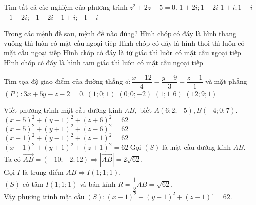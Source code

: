 \begin{ex}%
	Tìm tất cả các nghiệm của phương trình $z^2 + 2z +5=0$.
	\choice
	{$1+2i; 1-2i $}
	{$1+i; 1-i $}
	{\True $-1+2i; -1-2i $}
	{$-1+i; -1-i $}
\end{ex}
\begin{ex}%
	Trong các mệnh đề sau, mệnh đề nào đúng?
	\choice
	{Hình chóp có đáy là hình thang vuông thì luôn có mặt cầu ngoại tiếp}
	{Hình chóp có đáy là hình thoi thì luôn có mặt cầu ngoại tiếp}
	{Hình chóp có đáy là tứ giác thì luôn có mặt cầu ngoại tiếp}
	{\True Hình chóp có đáy là hình tam giác thì luôn có mặt cầu ngoại tiếp}
\end{ex}
\begin{ex}%
	Tìm tọa độ giao điểm của đường thẳng $d\colon \dfrac{x-12}{4}=\dfrac{y-9}{3}=\dfrac{z-1}{1}$ và mặt phẳng $(P)\colon 3x+5y-z-2=0$.
	\choice
	{$(1;0;1)$}
	{\True $(0;0;-2)$}
	{$(1;1;6)$}
	{$(12;9;1)$}
\end{ex}
\begin{ex}%
	Viết phương trình mặt cầu đường kính $ AB, $ biết $ A(6;2;-5), B(-4;0;7). $
	\choice
	{$ (x-5)^2+(y-1)^2 +(z+6)^2=62$}
	{$ (x+5)^2+(y+1)^2 +(z-6)^2=62$}
	{\True $ (x-1)^2+(y-1)^2 +(z-1)^2=62$}
	{$ (x+1)^2+(y+1)^2 +(z+1)^2=62$}
	\loigiai
	{Gọi $ (S) $ là mặt cầu đường kính $ AB $.\\
		Ta có $ \vec{AB} = (-10;-2;12) \Rightarrow | \vec{AB}| = 2 \sqrt{62}. $\\
		Gọi $ I $ là trung điểm $ AB \Rightarrow I(1;1;1). $\\
		$ (S) $ có tâm $ I(1;1;1) $ và bán kính $ R = \dfrac{1}{2} AB = \sqrt{62}. $\\
		Vậy phương trình mặt cầu $ (S):  (x-1)^2+(y-1)^2 +(z-1)^2=62.$ 
	}
\end{ex}

